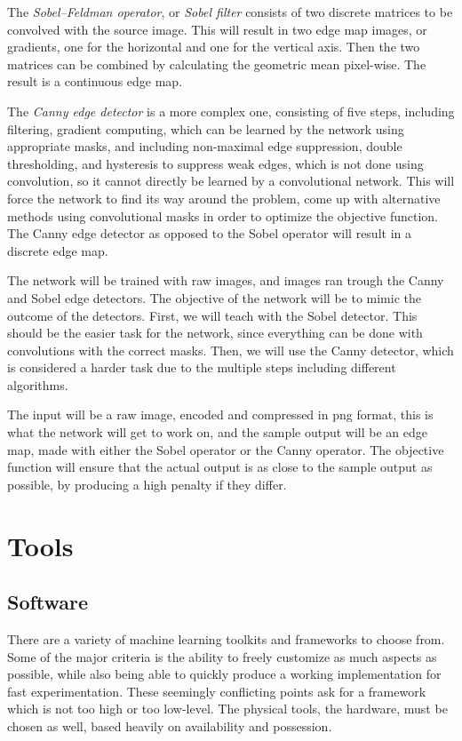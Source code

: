 \documentclass[12pt]{report}
\begin{document}
The \textit{Sobel–Feldman operator}, or \textit{Sobel filter} \cite{sobel} consists of two discrete matrices to be convolved with the source image. This will result in two edge map images, or gradients, one for the horizontal and one for the vertical axis. Then the two matrices can be combined by calculating the geometric mean pixel-wise. The result is a continuous edge map.\par

The \textit{Canny edge detector} \cite{canny} is a more complex one, consisting of five steps, including filtering, gradient computing, which can be learned by the network using appropriate masks, and including non-maximal edge suppression, double thresholding, and hysteresis to suppress weak edges, which is not done using convolution, so it cannot directly be learned by a convolutional network. This will force the network to find its way around the problem, come up with alternative methods using convolutional masks in order to optimize the objective function. The Canny edge detector as opposed to the Sobel operator will result in a discrete edge map.\par

The network will be trained with raw images, and images ran trough the Canny and Sobel edge detectors. The objective of the network will be to mimic the outcome of the detectors. First, we will teach with the Sobel detector. This should be the easier task for the network, since everything can be done with convolutions with the correct masks. Then, we will use the Canny detector, which is considered a harder task due to the multiple steps including different algorithms.\par

The input will be a raw image, encoded and compressed in png format, this is what the network will get to work on, and the sample output will be an edge map, made with either the Sobel operator or the Canny operator. The objective function will ensure that the actual output is as close to the sample output as possible, by producing a high penalty if they differ.
\section{Tools}
\subsection{Software}
There are a variety of machine learning toolkits and frameworks to choose from. Some of the major criteria is the ability to freely customize as much aspects as possible, while also being able to quickly produce a working implementation for fast experimentation. These seemingly conflicting points ask for a framework which is not too high or too low-level. The physical tools, the hardware, must be chosen as well, based heavily on availability and possession.\par
\end{document}
